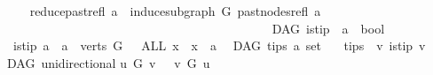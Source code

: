 \begin{isabellebody}
\ \ \ \isanewline
\ \ {\isachardoublequoteopen}reduce{\isacharunderscore}{\kern0pt}past{\isacharunderscore}{\kern0pt}refl\ a\ {\isacharequal}{\kern0pt}\ induce{\isacharunderscore}{\kern0pt}subgraph\ G\ {\isacharparenleft}{\kern0pt}past{\isacharunderscore}{\kern0pt}nodes{\isacharunderscore}{\kern0pt}refl\ a{\isacharparenright}{\kern0pt}{\isachardoublequoteclose}\isanewline
\ \ \ \ \ \ \ \ \ \ \ \ \ \ \ \ \ \ \ \ \ \ \ \ \ \ \ \ \ \ \ \ \ \ \ \ \ \ \ \ \ \ \isanewline
{}\isamarkupfalse%
\ {\isacharparenleft}{\kern0pt}\ DAG{\isacharparenright}{\kern0pt}\ is{\isacharunderscore}{\kern0pt}tip{\isacharcolon}{\kern0pt}{\isacharcolon}{\kern0pt}\ {\isachardoublequoteopen}\ {\isacharprime}{\kern0pt}a\ {\isasymRightarrow}\ bool{\isachardoublequoteclose}\isanewline
\ \ \ {\isachardoublequoteopen}is{\isacharunderscore}{\kern0pt}tip\ a\ {\isacharequal}{\kern0pt}\ {\isacharparenleft}{\kern0pt}{\isacharparenleft}{\kern0pt}a\ {\isasymin}\ verts\ G{\isacharparenright}{\kern0pt}\ {\isasymand}\ \ {\isacharparenleft}{\kern0pt}ALL\ x{\isachardot}{\kern0pt}\ {\isasymnot}\ x\ {\isasymrightarrow}\isactrlsup {\isacharplus}{\kern0pt}\ a{\isacharparenright}{\kern0pt}{\isacharparenright}{\kern0pt}{\isachardoublequoteclose}\isanewline
\isanewline
{}\isamarkupfalse%
\ {\isacharparenleft}{\kern0pt}\ DAG{\isacharparenright}{\kern0pt}\ tips{\isacharcolon}{\kern0pt}{\isacharcolon}{\kern0pt}\ {\isachardoublequoteopen}{\isacharprime}{\kern0pt}a\ set{\isachardoublequoteclose}\isanewline
\ \ \ {\isachardoublequoteopen}tips\ {\isacharequal}{\kern0pt}\ {\isacharbraceleft}{\kern0pt}v{\isachardot}{\kern0pt}\ is{\isacharunderscore}{\kern0pt}tip\ v{\isacharbraceright}{\kern0pt}{\isachardoublequoteclose}%
\isadelimdocument
%
\endisadelimdocument
%
\isatagdocument
%
\isamarkuptrue%
%
\endisatagdocument
{\isafolddocument}%
%
\isadelimdocument
%
\endisadelimdocument
{}\isamarkupfalse%
\ {\isacharparenleft}{\kern0pt}\ DAG{\isacharparenright}{\kern0pt}\ unidirectional{\isacharcolon}{\kern0pt}\isanewline
{\isachardoublequoteopen}u\ {\isasymrightarrow}\isactrlsup {\isacharplus}{\kern0pt}\isactrlbsub G\isactrlesub \ v\ {\isasymlongrightarrow}\ {\isasymnot}{\isacharparenleft}{\kern0pt}\ v\ {\isasymrightarrow}\isactrlsup {\isacharasterisk}{\kern0pt}\isactrlbsub G\isactrlesub \ u{\isacharparenright}{\kern0pt}{\isachardoublequoteclose}\isanewline
%
\isadelimproof
\ \ %
\endisadelimproof
%
\isatagproof
{}\isamarkupfalse%

\end{isabellebody}
